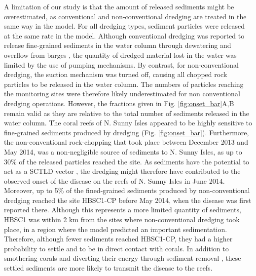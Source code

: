 A limitation of our study is that the amount of released sediments might be overestimated, as conventional and non-conventional dredging are treated in the same way in the model. For all dredging types, sediment particles were released at the same rate in the model. Although conventional dredging was reported to release fine-grained sediments in the water column through dewatering and overflow from barges \citep{jones2016assessing}, the quantity of dredged material lost in the water was limited by the use of pumping mechanisms. By contrast, for non-conventional dredging, the suction mechanism was turned off, causing all chopped rock particles to be released in the water column. The numbers of particles reaching the monitoring sites were therefore likely underestimated for non conventional dredging operations. However, the fractions given in Fig. \ref{fig:onset_bar}A,B remain valid as they are relative to the total number of sediments released in the water column. The coral reefs of N. Sunny Isles appeared to be highly sensitive to fine-grained sediments produced by dredging (Fig. \ref{fig:onset_bar}). Furthermore, the non-conventional rock-chopping that took place between December 2013 and May 2014, was a non-negligible source of sediments to N. Sunny Isles, as up to 30\% of the released particles reached the site. As sediments have the potential to act as a SCTLD vector \citep{rosales2020rhodobacterales, studivan2022reef}, the dredging might therefore have contributed to the observed onset of the disease on the reefs of N. Sunny Isles in June 2014. Moreover, up to 5\% of the fined-grained sediments produced by non-conventional dredging reached the site HBSC1-CP before May 2014, when the disease was first reported there. Although this represents a more limited quantity of sediments, HBSC1 was within 2 km from the sites where non-conventional dredging took place, in a region where the model predicted an important sedimentation. Therefore, although fewer sediments reached HBSC1-CP, they had a higher probability to settle and to be in direct contact with corals. In addition to smothering corals and diverting their energy through sediment removal \citep{erftemeijer2012environmental}, these settled sediments are more likely to transmit the disease to the reefs.

